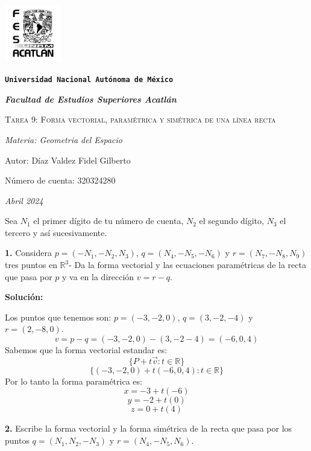 \documentclass{article}
\begin{document}
\begin{titlepage}
    \centering   
    {\includegraphics[width=2.5cm]{logo.png}\par}
    {\texttt{\bfseries \LARGE Universidad Nacional Autónoma de México} \par}
    \vspace{1cm}
    {\itshape \Large \bfseries Facultad de Estudios Superiores Acatlán \par}
    \vspace{3cm}
    {\scshape \Huge Tarea 9: Forma vectorial, paramétrica y simétrica de una línea recta \par}
    \vspace {3cm}
    {\slshape \Large Materia: Geometria del Espacio \par}
    \vspace{2cm}
    {\Large Autor: Díaz Valdez Fidel Gilberto\par}
    {\Large Número de cuenta: 320324280\par}
    \vfill
    {\itshape Abril 2024 \par}
\end{titlepage}

Sea $N_1$ el primer dígito de tu número de cuenta, $N_2$ el segundo dígito, $N_3$ el tercero y así
sucesivamente.
\vspace{10pt}

\textbf{1.} Considera $p = (-N_1, -N_2, N_3 )$, $q = (N_4, -N_5, -N_6)$ y $r = (N_7, -N_8, N_9 )$ tres puntos en $\mathbb{R}^3$-
Da la forma vectorial y las ecuaciones paramétricas de la recta que pasa por $p$ y va en la dirección $v = r-q$.
\vspace{10pt}

\textbf{Solución:}
\vspace{10pt}

Los puntos que tenemos son: $p =(-3,-2 , 0)$, $q =(3, -2, -4)$ y $r =(2, -8, 0)$. 
$$v = p-q =(-3,-2, 0) -(3, -2 -4 ) = (-6, 0, 4)$$
Sabemos que la forma vectorial estandar es:
$$\{P + t\vec{v}: t \in \mathbb{R}\}$$
$$\{(-3,-2, 0)+ t(-6, 0, 4): t \in \mathbb{R}\}$$
Por lo tanto la forma paramétrica es:
$$x = -3 + t(-6)$$
$$y =-2 + t(0)$$
$$z = 0 + t(4)$$

\textbf{2.} Escribe la forma vectorial y la forma simétrica de la recta que pasa por los puntos $q = (N_1, N_2,-N_3)$ y $r = (N_4, -N_5, N_6)$.
\vspace{10pt}
\end{document}
